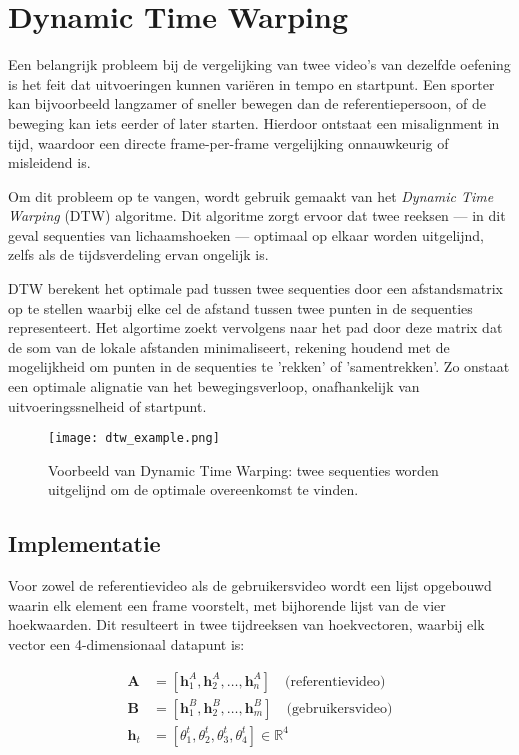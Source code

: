 \section{Dynamic Time Warping}
Een belangrijk probleem bij de vergelijking van twee video’s van dezelfde oefening is het feit dat uitvoeringen kunnen variëren in tempo en startpunt. 
Een sporter kan bijvoorbeeld langzamer of sneller bewegen dan de referentiepersoon, of de beweging kan iets eerder of later starten. 
Hierdoor ontstaat een misalignment in tijd, waardoor een directe frame-per-frame vergelijking onnauwkeurig of misleidend is.

Om dit probleem op te vangen, wordt gebruik gemaakt van het \textit{Dynamic Time Warping} (DTW) algoritme. 
Dit algoritme zorgt ervoor dat twee reeksen — in dit geval sequenties van lichaamshoeken — optimaal op elkaar worden uitgelijnd, zelfs als de tijdsverdeling ervan ongelijk is.

DTW berekent het optimale pad tussen twee sequenties door een afstandsmatrix op te stellen waarbij elke cel de afstand tussen twee punten in de sequenties representeert.
Het algortime zoekt vervolgens naar het pad door deze matrix dat de som van de lokale afstanden minimaliseert, rekening houdend met de mogelijkheid om punten in de sequenties te 'rekken' of 'samentrekken'.
Zo onstaat een optimale alignatie van het bewegingsverloop, onafhankelijk van uitvoeringssnelheid of startpunt.

\begin{figure}[h]
    \centering
    \texttt{[image: dtw\_example.png]}
    \caption{Voorbeeld van Dynamic Time Warping: twee sequenties worden uitgelijnd om de optimale overeenkomst te vinden.}
    \label{fig:dtw_example}
\end{figure}

\subsection{Implementatie}

Voor zowel de referentievideo als de gebruikersvideo wordt een lijst opgebouwd waarin elk element een frame voorstelt, met bijhorende lijst van de vier hoekwaarden. 
Dit resulteert in twee tijdreeksen van hoekvectoren, waarbij elk vector een 4-dimensionaal datapunt is:

\begin{align*}
    \textbf{A} &= [\mathbf{h}_1^A, \mathbf{h}_2^A, \dots, \mathbf{h}_n^A] \quad \text{(referentievideo)} \\
    \textbf{B} &= [\mathbf{h}_1^B, \mathbf{h}_2^B, \dots, \mathbf{h}_m^B] \quad \text{(gebruikersvideo)} \\
    \mathbf{h}_t &= [\theta_1^t, \theta_2^t, \theta_3^t, \theta_4^t] \in \mathbb{R}^4
\end{align*}

